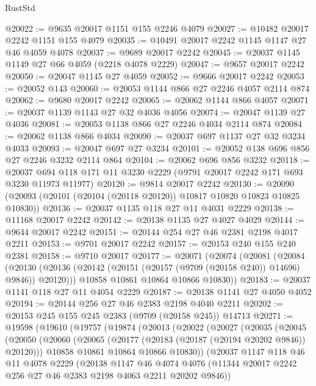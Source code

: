 \begin{lexlean}{RustStd}
\begin{coremodule}
@20022 := @9635 @20017 @1151 @155 @2246 @4079
@20027 := @10482 @20017 @2242 @1151 @155 @4079
@20035 := @10491 @20017 @2242 @1145 @1147 @27 @46 @4059 @4078
@20037 := @9689 @20017 @2242
@20045 := @20037 @1145 @1149 @27 @66 @4059 (@2218 @4078 @2229)
@20047 := @9657 @20017 @2242
@20050 := @20047 @1145 @27 @4059
@20052 := @9666 @20017 @2242
@20053 := @20052 @143
@20060 := @20053 @1144 @866 @27 @2246 @4057 @2114 @874
@20062 := @9680 @20017 @2242
@20065 := @20062 @1144 @866 @4057
@20071 := @20037 @1139 @1143 @27 @32 @4036 @4056
@20074 := @20047 @1139 @27 @4036
@20081 := @20053 @1138 @866 @27 @2246 @4034 @2114 @874
@20084 := @20062 @1138 @866 @4034
@20090 := @20037 @697 @1137 @27 @32 @3234 @4033
@20093 := @20047 @697 @27 @3234
@20101 := @20052 @138 @696 @856 @27 @2246 @3232 @2114 @864
@20104 := @20062 @696 @856 @3232
@20118 := @20037 @694 @118 @171 @11 @3230 @2229 (@9791 @20017 @2242 @171 @693 @3230 @11973 @11977)
@20120 := @9814 @20017 @2242
@20130 := @20090 (@20093 (@20101 (@20104 (@20118 @20120)) @10817 @10820 @10823 @10825 @10830))
@20136 := @20037 @1135 @118 @27 @11 @4031 @2229
@20138 := @11168 @20017 @2242
@20142 := @20138 @1135 @27 @4027 @4029
@20144 := @9644 @20017 @2242
@20151 := @20144 @254 @27 @46 @2381 @2198 @4017 @2211
@20153 := @9701 @20017 @2242
@20157 := @20153 @240 @155 @240 @2381
@20158 := @9710 @20017
@20177 := @20071
    (@20074
      (@20081
        (@20084
          (@20130 (@20136 (@20142 (@20151 (@20157 (@9709 (@20158 @240)) @14696) @9846)) @20120)))
        @10858
        @10861
        @10864
        @10866
        @10830))
@20183 := @20037 @1141 @118 @27 @11 @4054 @2229
@20187 := @20138 @1141 @27 @4050 @4052
@20194 := @20144 @256 @27 @46 @2383 @2198 @4040 @2211
@20202 := @20153 @245 @155 @245 @2383 (@9709 (@20158 @245)) @14713
@20271 := @19598
    (@19610
      (@19757
        (@19874
          (@20013
            (@20022
              (@20027
                (@20035
                  (@20045
                    (@20050
                      (@20060
                        (@20065 (@20177 (@20183 (@20187 (@20194 @20202 @9846)) @20120)))
                        @10858
                        @10861
                        @10864
                        @10866
                        @10830))
                    (@20037
                      @1147
                      @118
                      @46
                      @11
                      @4078
                      @2229
                      (@20138
                        @1147
                        @46
                        @4074
                        @4076
                        (@11344 @20017 @2242 @256 @27 @46 @2383 @2198 @4063 @2211 @20202 @9846))

\end{coremodule}
\end{lexlean}
